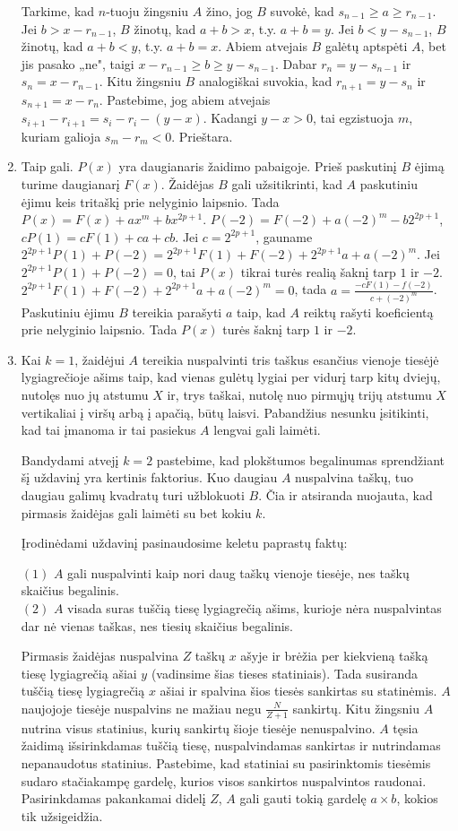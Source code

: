 \begin{enumerate}
Tarkime, kad $n$-tuoju žingsniu $A$ žino, jog $B$ suvokė, kad
$s_{n-1}\geq a\geq r_{n-1}$. Jei $b> x-r_{n-1}$, $B$ žinotų, kad $a+b>x$,
t.y. $a+b=y$.  Jei $b<y-s_{n-1}$, $B$ žinotų, kad $a+b<y$, t.y. $a+b=x$.
Abiem atvejais $B$	galėtų aptspėti $A$, bet jis pasako „ne", taigi
$x-r_{n-1}\geq b\geq y-s_{n-1}$. Dabar $r_{n}=y-s_{n-1}$ ir
$s_{n}=x-r_{n-1}$. Kitu žingsniu $B$ analogiškai suvokia, kad
$r_{n+1}=y-s_{n}$ ir $s_{n+1}=x-r_{n}$.  Pastebime, jog abiem atvejais
$s_{i+1}-r_{i+1}=s_{i}-r_{i}-(y-x)$. Kadangi $y-x>0$, tai egzistuoja $m$,
kuriam galioja $s_{m}-r_{m}<0$. Prieštara.
\item 
Taip gali. $P(x)$ yra daugianaris žaidimo pabaigoje. Prieš paskutinį $B$
ėjimą turime daugianarį $F(x)$. Žaidėjas $B$ gali užsitikrinti, kad $A$
paskutiniu ėjimu keis tritaškį prie nelyginio laipsnio. Tada
$P(x)=F(x)+ax^m+bx^{2p+1}$. $P(-2)=F(-2)+a(-2)^m-b2^{2p+1}$,
$cP(1)=cF(1)+ca+cb$. Jei $c=2^{2p+1}$, gauname
$2^{2p+1}P(1)+P(-2)=2^{2p+1}F(1)+F(-2)+2^{2p+1}a+a(-2)^m$. Jei
$2^{2p+1}P(1)+P(-2)=0$, tai $P(x)$ tikrai turės realią šaknį tarp $1$ ir
$-2$.  $2^{2p+1}F(1)+F(-2)+2^{2p+1}a+a(-2)^m=0$, tada
$a=\frac{-cF(1)-f(-2)}{c+(-2)^m}$. Paskutiniu ėjimu $B$ tereikia parašyti
$a$ taip, kad $A$ reiktų rašyti koeficientą prie nelyginio laipsnio. Tada
$P(x)$ turės šaknį tarp $1$ ir $-2$.
\item 
Kai $k=1$, žaidėjui $A$ tereikia nuspalvinti tris taškus esančius vienoje
tiesėjė lygiagrečioje ašims taip, kad vienas gulėtų lygiai per vidurį tarp
kitų dviejų, nutolęs nuo jų atstumu $X$ ir, trys taškai, nutolę nuo pirmųjų
trijų atstumu $X$ vertikaliai į viršų arbą į apačią, būtų laisvi. Pabandžius
nesunku įsitikinti, kad tai įmanoma ir tai pasiekus $A$ lengvai gali
laimėti. 

Bandydami atvejį $k=2$ pastebime, kad plokštumos begalinumas sprendžiant
šį uždavinį yra kertinis faktorius. Kuo daugiau $A$ nuspalvina taškų, tuo
daugiau galimų kvadratų turi užblokuoti $B$. Čia ir atsiranda nuojauta, kad
pirmasis žaidėjas gali laimėti su bet kokiu $k$.

Įrodinėdami uždavinį pasinaudosime keletu paprastų faktų:

$(1)$ $A$ gali nuspalvinti kaip nori daug taškų vienoje tiesėje, nes taškų
skaičius begalinis.\\
$(2)$ $A$ visada suras tuščią tiesę lygiagrečią ašims, kurioje nėra
nuspalvintas dar nė vienas taškas, nes tiesių skaičius begalinis.

Pirmasis žaidėjas nuspalvina $Z$ taškų $x$ ašyje ir brėžia per kiekvieną
tašką tiesę lygiagrečią ašiai $y$ (vadinsime šias tieses statiniais). Tada
susiranda tuščią tiesę lygiagrečią $x$ ašiai ir spalvina šios tiesės
sankirtas su statinėmis. $A$ naujojoje tiesėje nuspalvins ne mažiau negu $
\frac{N}{Z+1} $ sankirtų. Kitu žingsniu $A$ nutrina visus statinius,
kurių sankirtų šioje tiesėje nenuspalvino. $A$ tęsia žaidimą išsirinkdamas
tuščią tiesę, nuspalvindamas sankirtas ir nutrindamas nepanaudotus
statinius. Pastebime, kad statiniai su pasirinktomis tiesėmis sudaro
stačiakampę gardelę, kurios visos sankirtos nuspalvintos raudonai.
Pasirinkdamas pakankamai didelį $Z$, $A$ gali gauti tokią gardelę  $ a\times b
$, kokios tik užsigeidžia. 


\end{enumerate}
